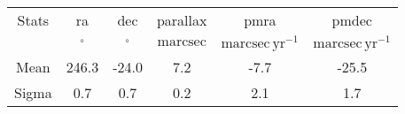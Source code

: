 \begin{table}
\begin{tabular}{cccccc}
Stats & ra & dec & parallax & pmra & pmdec \\
 & $\mathrm{{}^{\circ}}$ & $\mathrm{{}^{\circ}}$ & $\mathrm{marcsec}$ & $\mathrm{marcsec\,yr^{-1}}$ & $\mathrm{marcsec\,yr^{-1}}$ \\
Mean & 246.3 & -24.0 & 7.2 & -7.7 & -25.5 \\
Sigma & 0.7 & 0.7 & 0.2 & 2.1 & 1.7 \\
\end{tabular}
\end{table}
